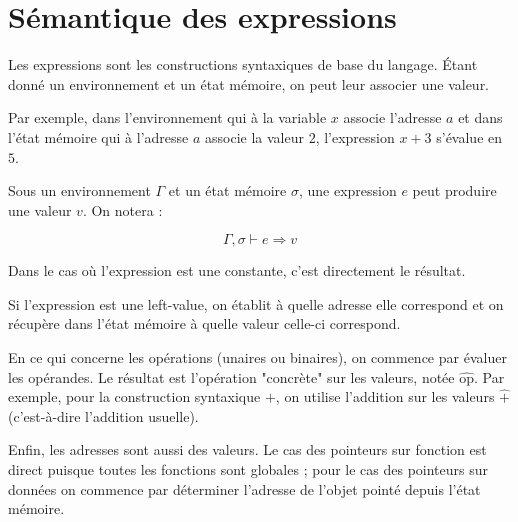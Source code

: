 \section{Sémantique des expressions}
\label{sec:sem-expr}

Les expressions sont les constructions syntaxiques de base du langage. Étant
donné un environnement et un état mémoire, on peut leur associer une valeur.

Par exemple, dans l'environnement qui à la variable $x$ associe l'adresse $a$ et
dans l'état mémoire qui à l'adresse $a$ associe la valeur $2$, l'expression $x +
3$ s'évalue en $5$.

\begin{definition}
  Sous un environnement $Γ$ et un état mémoire $σ$, une expression $e$ peut
  produire une valeur $v$. On notera :

  \[ Γ, σ ⊢ e ⇒ v \]
\end{definition}

Dans le cas où l'expression est une constante, c'est directement le résultat.

\begin{mathpar}
\end{mathpar}

Si l'expression est une left-value, on établit à quelle adresse elle correspond
et on récupère dans l'état mémoire à quelle valeur celle-ci correspond.

\begin{mathpar}
\end{mathpar}

En ce qui concerne les opérations (unaires ou binaires), on commence par évaluer
les opérandes. Le résultat est l'opération "concrète" sur les valeurs, notée
$\widehat{\textrm{op}}$. Par exemple, pour la construction syntaxique $+$, on
utilise l'addition sur les valeurs $\widehat{+}$ (c'est-à-dire l'addition
usuelle).


Enfin, les adresses sont aussi des valeurs. Le cas des pointeurs sur fonction
est direct puisque toutes les fonctions sont globales ; pour le cas des
pointeurs sur données on commence par déterminer l'adresse de l'objet pointé
depuis l'état mémoire.

